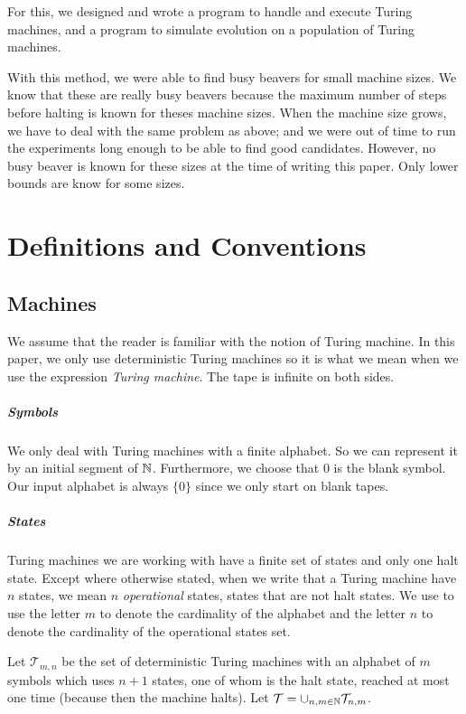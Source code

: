 \documentclass{report}
\begin{document}
For this, we designed and wrote a program to handle and execute Turing machines, and a program to simulate evolution on a population of Turing machines.

With this method, we were able to find busy beavers for small machine sizes. We know that these are really busy beavers because the maximum number of steps before halting is known for theses machine sizes. When the machine size grows, we have to deal with the same problem as above; and we were out of time to run the experiments long enough to be able to find good candidates. However, no busy beaver is known for these sizes at the time of writing this paper. Only lower bounds are know for some sizes.

\chapter{Definitions and Conventions}
\label{chap:pre}

\section{Machines}
\label{sec:ma}

We assume that the reader is familiar with the notion of Turing machine. In this paper, we only use deterministic Turing machines so it is what we mean when we use the expression \emph{Turing machine}. The tape is infinite on both sides.

\paragraph{Symbols}
We only deal with Turing machines with a finite alphabet. So we can represent it by an initial segment of $\mathbb{N}$. Furthermore, we choose that $0$ is the blank symbol. Our input alphabet is always $\{0\}$ since we only start on blank tapes. 

\paragraph{States}
Turing machines we are working with have a finite set of states and only one halt state.
 Except where otherwise stated, when we write that a Turing machine have $n$ states, we mean $n$ \emph{operational} states, \ie states that are not halt states. We use to use the letter $m$ to denote the cardinality of the alphabet and the letter $n$ to denote the cardinality of the operational states set.

 Let $\mathcal{T}_{m,n}$ be the set of deterministic Turing machines with an alphabet of $m$ symbols which uses $n + 1$ states, one of whom is the halt state, reached at most one time (because then the machine halts). Let  $\mathcal{T} = \cup_{n,m \in \mathbb{N}} \mathcal{T}_{n,m}$.
\end{document}
